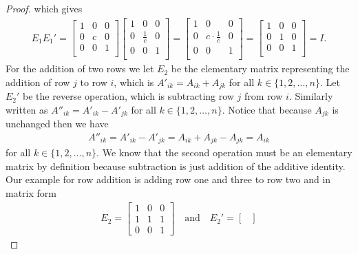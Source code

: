 \documentclass{article}
\begin{document}
\begin{flushleft}
\begin{proof}
			which gives
			\begin{align*}
				E_1 E_1' = \begin{bmatrix}
					1 & 0 & 0 \\
					0 & c & 0 \\
					0 & 0 & 1 \\
				\end{bmatrix}
				\begin{bmatrix}
					1 & 0 & 0 \\
					0 & \frac{1}{c} & 0 \\
					0 & 0 & 1 \\
				\end{bmatrix} =
				\begin{bmatrix}
					1 & 0 & 0 \\
					0 & c \cdot \frac{1}{c} & 0 \\
					0 & 0 & 1 \\
				\end{bmatrix} =
				\begin{bmatrix}
					1 & 0 & 0 \\
					0 & 1 & 0 \\
					0 & 0 & 1 \\
				\end{bmatrix} = I.
			\end{align*}
			For the addition of two rows we let $E_2$ be the elementary matrix representing the addition of row $j$ to row $i$, which is $A'_{ik} = A_{ik} + A_{jk}$ for all $k \in \{ 1, 2, \ldots, n \}$. Let $E_2'$ be the reverse operation, which is subtracting row $j$ from row $i$. Similarly written as $A''_{ik} = A'_{ik} - A'_{jk}$ for all $k \in \{ 1, 2, \ldots, n \}$. Notice that because $A_{jk}$ is unchanged then we have
			\begin{align*}
				A''_{ik} = A'_{ik} - A'_{jk} = A_{ik} + A_{jk} - A_{jk} = A_{ik}
			\end{align*}
			for all $k \in \{ 1, 2, \ldots, n \}$. We know that the second operation must be an elementary matrix by definition because subtraction is just addition of the additive identity. Our example for row addition is adding row one and three to row two and in matrix form
			\begin{align*}
				E_2 = \begin{bmatrix}
					1 & 0 & 0 \\
					1 & 1 & 1 \\
					0 & 0 & 1
				\end{bmatrix} \quad \text{and} \quad
				E_2' = \begin{bmatrix}

\end{bmatrix}
\end{align*}
\end{proof}
\end{flushleft}
\end{document}
